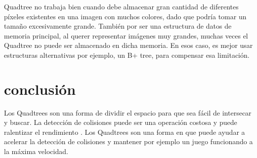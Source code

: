  Quadtree no trabaja bien  cuando debe almacenar gran cantidad de diferentes píxeles existentes en una imagen con muchos colores, dado que podría tomar un tamaño excesivamente grande.
    También por ser una estructura de datos de memoria principal, al querer representar imágenes muy grandes, muchas veces el Quadtree no puede ser almacenado en dicha memoria. En esos caso, es mejor usar  estructuras alternativas por ejemplo, un B+ tree, para compensar esa limitación.


\section{conclusión}

Los Quadtrees son una forma de dividir el espacio para que sea fácil de intersecar y buscar.
La detección de colisiones puede ser una operación costosa y puede ralentizar el rendimiento  . Los Quadtrees son una forma en que puede ayudar a acelerar la detección de colisiones y mantener por ejemplo un juego funcionando a la máxima velocidad.
